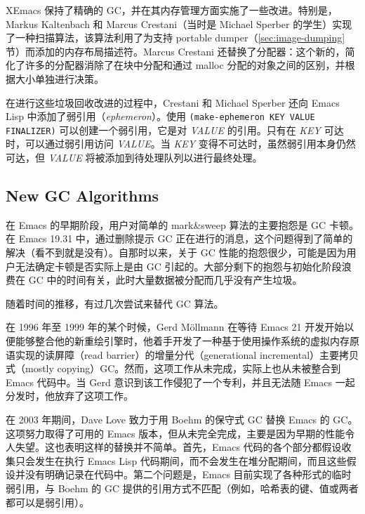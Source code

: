 \documentclass[format=acmsmall,screen]{acmart}
\newcommand \id[1] {\textrm{\textsl{#1}}}
\begin{document}
XEmacs 保持了精确的 GC，并在其内存管理方面实施了一些改进。特别是，Markus Kaltenbach 和 Marcus Crestani（当时是 Michael Sperber 的学生）实现了一种扫描算法，该算法利用了为支持 portable dumper（\ref{sec:image-dumping} 节）而添加的内存布局描述符。Marcus Crestani 还替换了分配器：这个新的，简化了许多的分配器消除了在块中分配和通过 malloc 分配的对象之间的区别，并根据大小单独进行决策\cite{Crestani2005}。

在进行这些垃圾回收改进的过程中，Crestani 和 Michael Sperber 还向 Emacs Lisp 中添加了弱引用（\emph{ephemeron}）\cite{Hayes1997}。使用 \texttt{(make-ephemeron KEY VALUE FINALIZER)} 可以创建一个弱引用，它是对 \id{VALUE} 的引用。只有在 \id{KEY} 可达时，可以通过弱引用访问 \id{VALUE}。当 \id{KEY} 变得不可达时，虽然弱引用本身仍然可达，但 \id{VALUE} 将被添加到待处理队列以进行最终处理。

\subsection{New GC Algorithms}
\label{sec:gc-algorithms}
在 Emacs 的早期阶段，用户对简单的 mark\&sweep 算法的主要抱怨是 GC 卡顿。在 Emacs 19.31 中，通过删除提示 GC 正在进行的消息，这个问题得到了简单的解决（看不到就是没有）。自那时以来，关于 GC 性能的抱怨很少，可能是因为用户无法确定卡顿是否实际上是由 GC 引起的。大部分剩下的抱怨与初始化阶段浪费在 GC 中的时间有关，此时大量数据被分配而几乎没有产生垃圾。

随着时间的推移，有过几次尝试来替代 GC 算法。


在 1996 年至 1999 年的某个时候，Gerd Möllmann 在等待 Emacs 21 开发开始以便能够整合他的新重绘引擎时，他着手开发了一种基于使用操作系统的虚拟内存原语实现的读屏障（read barrier）的增量分代（generational incremental）主要拷贝式（mostly copying）GC。然而，这项工作从未完成，实际上也从未被整合到 Emacs 代码中。当 Gerd 意识到该工作侵犯了一个专利，并且无法随 Emacs 一起分发时，他放弃了这项工作。

在 2003 年期间，Dave Love 致力于用 Boehm 的保守式 GC 替换 Emacs 的 GC。这项努力取得了可用的 Emacs 版本，但从未完全完成，主要是因为早期的性能令人失望。这也表明这样的替换并不简单。首先，Emacs 代码的各个部分都假设收集只会发生在执行 Emacs Lisp 代码期间，而不会发生在堆分配期间，而且这些假设并没有明确记录在代码中。第二个问题是，Emacs 目前实现了各种形式的临时弱引用，与 Boehm 的 GC 提供的引用方式不匹配（例如，哈希表的键、值或两者都可以是弱引用）。
\end{document}
